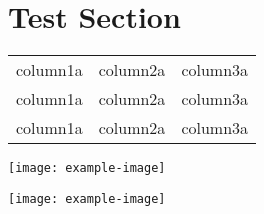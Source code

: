 \documentclass{article}
\newcounter{example}[section]
\newenvironment{example}{%
  \tcolorbox[examplebox]}%
 {\endtcolorbox}
\begin{document}
\section{Test Section}

\begin{example}
\lipsum[4]
\begin{center}
\begin{tabular}{ccc}
\toprule
column1a & column2a & column3a \\
column1a & column2a & column3a \\
column1a & column2a & column3a \\
\bottomrule
\end{tabular}
\end{center}
\begin{center}
\texttt{[image: example-image]}
\end{center}
\end{example}
\lipsum*[2-3]
\begin{example}
\lipsum*[1-4]
\begin{center}
\texttt{[image: example-image]}
\end{center}
\lipsum*[5-6]
\end{example}
\lipsum*[2]
\end{document}
